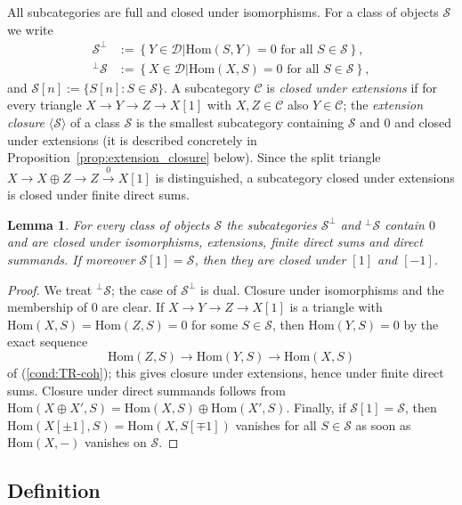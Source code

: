 \documentclass[12pt]{amsart}
\newcommand{\condref}[1]{\textup{(\ref{#1})}}
\newtheorem{lemma}[theorem]{Lemma}
\numberwithin{theorem}{section}
\theoremstyle{definition}
\newcommand{\Hom}{\mathrm{Hom}}
\newcommand{\calD}{\mathcal{D}}
\newcommand{\defineset}[2]{\left\{
	\left.
	#1
	\right\vert
	#2
	\right\}}
\begin{document}
	All subcategories are full and closed under isomorphisms.
	For a class of objects $\mathcal{S}$ we write
	\begin{align*}
		\mathcal{S}^{\perp} &:= \defineset{ Y \in \calD }{ \Hom(S, Y) = 0 \text{ for all } S \in \mathcal{S} }, \\
		{}^{\perp}\mathcal{S} &:= \defineset{ X \in \calD }{ \Hom(X, S) = 0 \text{ for all } S \in \mathcal{S} },
	\end{align*}
	and $\mathcal{S}[n] := \{ S[n] : S \in \mathcal{S} \}$.
	A subcategory $\mathcal{C}$ is \emph{closed under extensions} if for every triangle $X \to Y \to Z \to X[1]$ with $X, Z \in \mathcal{C}$ also $Y \in \mathcal{C}$;
	the \emph{extension closure} $\langle \mathcal{S} \rangle$ of a class $\mathcal{S}$ is the smallest subcategory containing $\mathcal{S}$ and $0$ and closed under extensions (it is described concretely in Proposition~\ref{prop:extension_closure} below).
	Since the split triangle $X \to X \oplus Z \to Z \xrightarrow{0} X[1]$ is distinguished, a subcategory closed under extensions is closed under finite direct sums.
	
	\begin{lemma}
		\label{lem:orthogonals}
		For every class of objects $\mathcal{S}$ the subcategories $\mathcal{S}^{\perp}$ and ${}^{\perp}\mathcal{S}$ contain $0$ and are closed under isomorphisms, extensions, finite direct sums and direct summands.
		If moreover $\mathcal{S}[1] = \mathcal{S}$, then they are closed under $[1]$ and $[-1]$.
	\end{lemma}
	
	\begin{proof}
		We treat ${}^{\perp}\mathcal{S}$; the case of $\mathcal{S}^{\perp}$ is dual.
		Closure under isomorphisms and the membership of $0$ are clear.
		If $X \to Y \to Z \to X[1]$ is a triangle with $\Hom(X, S) = \Hom(Z, S) = 0$ for some $S \in \mathcal{S}$, then $\Hom(Y, S) = 0$ by the exact sequence
		\[
		\Hom(Z, S) \to \Hom(Y, S) \to \Hom(X, S)
		\]
		of \condref{cond:TR-coh}; this gives closure under extensions, hence under finite direct sums.
		Closure under direct summands follows from $\Hom(X \oplus X', S) = \Hom(X, S) \oplus \Hom(X', S)$.
		Finally, if $\mathcal{S}[1] = \mathcal{S}$, then $\Hom(X[\pm 1], S) = \Hom(X, S[\mp 1])$ vanishes for all $S \in \mathcal{S}$ as soon as $\Hom(X, -)$ vanishes on $\mathcal{S}$.
	\end{proof}
	
	\subsection{Definition}
	
\end{document}

